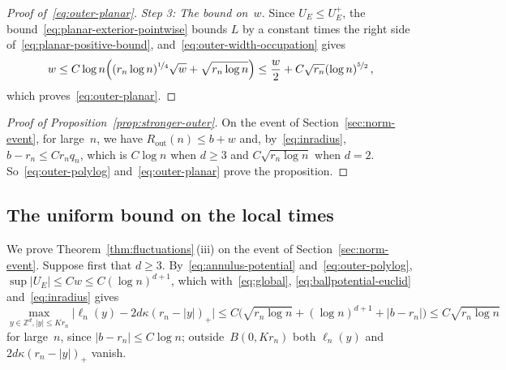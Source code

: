 \documentclass[11pt]{amsart}
\theoremstyle{plain}
\theoremstyle{definition}
\newcommand{\Z}{\mathbb Z}
\newcommand{\drift}{\kappa}
\newcommand{\nf}{\nicefrac}
\newcommand{\Rout}{R_{\mathrm{out}}}
\numberwithin{equation}{section}
\begin{document}
\begin{proof}[Proof of~\eqref{eq:outer-planar}]
\emph{Step 3: The bound on~$w$.} Since $U_E\leq U_E^+$, the bound~\eqref{eq:planar-exterior-pointwise} bounds $L$ by a constant times the right side of~\eqref{eq:planar-positive-bound}, and~\eqref{eq:outer-width-occupation} gives
\begin{equation*}
w\leq C\log n\Bigl((r_n\log n)^{\nf14}\sqrt w+\sqrt{r_n\log n}\Bigr)\leq\frac w2+C\sqrt{r_n}(\log n)^{\nf52}\, ,
\end{equation*}
which proves~\eqref{eq:outer-planar}.
\end{proof}

\begin{proof}[Proof of Proposition~\ref{prop:stronger-outer}]
On the event of Section~\ref{sec:norm-event}, for large~$n$, we have $\Rout(n)\leq b+w$ and, by~\eqref{eq:inradius}, $b-r_n\leq Cr_nq_n$, which is $C\log n$ when $d\geq3$ and $C\sqrt{r_n\log n}$ when $d=2$. So~\eqref{eq:outer-polylog} and~\eqref{eq:outer-planar} prove the proposition.
\end{proof}

\subsection{The uniform bound on the local times}\label{sec:global-profile}

We prove Theorem~\ref{thm:fluctuations}\,(iii) on the event of Section~\ref{sec:norm-event}. Suppose first that $d\geq3$. By~\eqref{eq:annulus-potential} and~\eqref{eq:outer-polylog}, $\sup|U_E|\leq Cw\leq C(\log n)^{d+1}$, which with~\eqref{eq:global}, \eqref{eq:ballpotential-euclid} and~\eqref{eq:inradius} gives
\begin{equation*}
\max_{y\in\Z^d,|y|\leq Kr_n}\bigl|\ell_n(y)-2d\drift(r_n-|y|)_+\bigr|
\leq C\bigl(\sqrt{r_n\log n}+(\log n)^{d+1}+|b-r_n|\bigr)
\leq C\sqrt{r_n\log n}
\end{equation*}
for large~$n$, since $|b-r_n|\leq C\log n$; outside~$B(0,Kr_n)$ both $\ell_n(y)$ and $2d\drift(r_n-|y|)_+$ vanish.
\end{document}
